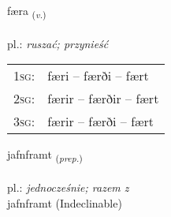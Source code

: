 \documentclass[frontgrid, backgrid]{flacards}\usepackage[]{graphicx}\usepackage[]{xcolor}
\begin{document}
\renewcommand{\blhead}{\vskip5pt {\small\bfseries\footnotesize Sagnorð | Verb }}
\renewcommand{\bcfoot}{\vskip5pt \hspace{2pt}{\small\bfseries\footnotesize 1K}}


{færa \small{\textsubscript{(\textit{v.})}} \\[1ex] %
\textphonetic{[faiːra]} \\
pl.: \emph{ruszać; przynieść} \\  [2ex]
\renewcommand*{\arraystretch}{0.8}
\begin{tabular}{p{1cm}l}
\textsc{1sg}: & færi -- færði -- fært \\ 
\textsc{2sg}: & færir -- færðir -- fært \\ 
\textsc{3sg}: & færir -- færði -- fært \\ 
\end{tabular}
}


\renewcommand{\flhead}{\vskip5pt \fboxsep=0pt {\small\bfseries\footnotesize Forsetning | Preposition}}
\renewcommand{\fcfoot}{\vskip5pt \fboxsep=0pt \hspace{2pt}{\small\bfseries\footnotesize 1K}}

\renewcommand{\blhead}{\vskip5pt {\small\bfseries\footnotesize Forsetning | Preposition }}
\renewcommand{\bcfoot}{\vskip5pt \hspace{2pt}{\small\bfseries\footnotesize 1K}}


{jafnframt \small{\textsubscript{(\textit{prep.})}} \\[1ex]
 \\
pl.: \emph{jednocześnie; razem z} \\  [2ex]
jafnframt (Indeclinable)}


\renewcommand{\flhead}{\vskip5pt \fboxsep=0pt {\small\bfseries\footnotesize Forsetning | Preposition}}
\renewcommand{\fcfoot}{\vskip5pt \fboxsep=0pt \hspace{2pt}{\small\bfseries\footnotesize 1K}}
\end{document}
